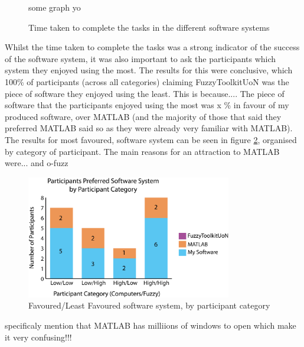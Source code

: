 {\begin{figure}[ht!]
\begin{center}
some graph yo
\end{center}
\vspace{-5mm}
\caption{Time taken to complete the tasks in the different software systems}
\label{fig:times}
\vspace{-2mm}
\end{figure}

Whilst the time taken to complete the tasks was a strong indicator of the success of the software system, it was also important to ask the participants which system they enjoyed using the most. The results for this were conclusive, which 100\% of participants (across all categories) claiming FuzzyToolkitUoN was the piece of software they enjoyed using the least. {\color{red} This is because...}. The piece of software that the participants enjoyed using the most was {\color{red} x \%} in favour of my produced software, over MATLAB (and the majority of those that said they preferred MATLAB said so as they were already very familiar with MATLAB). The results for most favoured,  software system can be seen in figure \ref{fig:mostleast}, organised by category of participant. {\color{red} The main reasons for an attraction to MATLAB were... and o-fuzz}

\begin{figure}[ht!]
\begin{center}
\includegraphics[width=0.8\textwidth]{images/graphsSmall.png}
\end{center}
\vspace{-5mm}
\caption{Favoured/Least Favoured software system, by participant category}
\label{fig:mostleast}
\vspace{-2mm}
\end{figure}

{\color{red}
specificaly mention that MATLAB has milliions of windows to open which make it very confusing!!!
}

}
